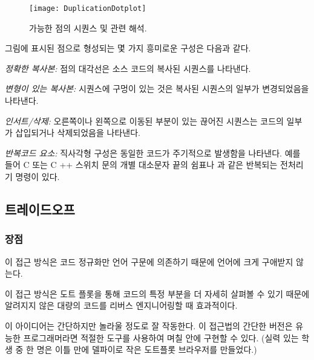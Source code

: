 \documentclass[a4paper,10pt,twoside]{book}
\begin{document}
\begin{figure}
\begin{center}
\texttt{[image: DuplicationDotplot]}
\caption{가능한 점의 시퀀스 및 관련 해석.}
\end{center}
\end{figure}

그림에 표시된 점으로 형성되는 몇 가지 흥미로운 구성은 다음과 같다.

\begin{bulletlist}
\item \emph{정확한 복사본:} 점의 대각선은 소스 코드의 복사된 시퀀스를 나타낸다.

\item \emph{변형이 있는 복사본:} 시퀀스에 구멍이 있는 것은 복사된 시퀀스의 일부가 변경되었음을 나타낸다.

\item \emph{인서트/삭제:} 오른쪽이나 왼쪽으로 이동된 부분이 있는 끊어진 시퀀스는 코드의 일부가 삽입되거나 삭제되었음을 나타낸다.

\item  \emph{반복코드 요소:} 직사각형 구성은 동일한 코드가 주기적으로 발생함을 나타낸다. 예를 들어 C 또는 C ++ 스위치 문의 개별 대소문자 끝의 쉼표나 과 같은 반복되는 전처리기 명령이 있다.
\end{bulletlist}

\subsection*{트레이드오프}

\subsubsection*{장점}

\begin{bulletlist}
\item 이 접근 방식은 코드 정규화만 언어 구문에 의존하기 때문에 언어에 크게 구애받지 않는다.

\item 이 접근 방식은 도트 플롯을 통해 코드의 특정 부분을 더 자세히 살펴볼 수 있기 때문에 알려지지 않은 대량의 코드를 리버스 엔지니어링할 때 효과적이다.

\item 이 아이디어는 간단하지만 놀라울 정도로 잘 작동한다. 이 접근법의 간단한 버전은 유능한 프로그래머라면 적절한 도구를 사용하여 며칠 안에 구현할 수 있다. (실력 있는 학생 중 한 명은 이틀 만에 델파이로 작은 도트플롯 브라우저를 만들었다.)
\end{bulletlist}
\end{document}
